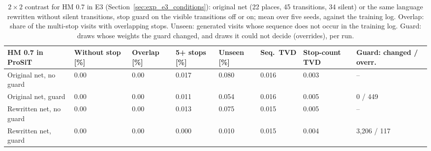 \begin{table}[htbp]
\centering
\scriptsize
\setlength{\tabcolsep}{3pt}
\begin{tabularx}{\textwidth}{L{3.0cm}YYYYYYY}
\toprule
\textbf{HM 0.7 in ProSiT} & \textbf{Without stop [\%]} & \textbf{Overlap [\%]} & \textbf{5+ stops [\%]} & \textbf{Unseen [\%]} & \textbf{Seq.\ TVD} & \textbf{Stop-count TVD} & \textbf{Guard: changed / overr.} \\
\midrule
Original net, no guard & 0.00 & 0.00 & 0.017 & 0.080 & 0.016 & 0.003 & -- \\
Original net, guard & 0.00 & 0.00 & 0.011 & 0.054 & 0.016 & 0.005 & 0 / 449 \\
Rewritten net, no guard & 0.00 & 0.00 & 0.013 & 0.075 & 0.015 & 0.005 & -- \\
Rewritten net, guard & 0.00 & 0.00 & 0.000 & 0.010 & 0.015 & 0.004 & 3,206 / 117 \\
\bottomrule
\end{tabularx}
\caption{$2\times2$ contrast for HM 0.7 in E3 (Section~\ref{sec:exp_e3_conditions}): original net (22 places, 45 transitions, 34 silent) or the same language rewritten without silent transitions, stop guard on the visible transitions off or on; mean over five seeds, against the training log. Overlap: share of the multi-stop visits with overlapping stops. Unseen: generated visits whose sequence does not occur in the training log. Guard: draws whose weights the guard changed, and draws it could not decide (overrides), per run.}
\label{tab:app_rewritten_2x2_hm}
\end{table}
